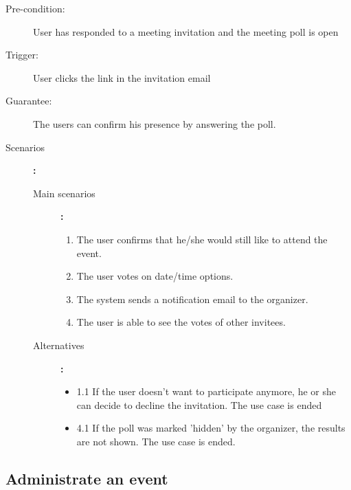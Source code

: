 \begin{description}
	\item[Pre-condition:] User has responded to a meeting invitation and the meeting poll is open
	\item[Trigger:] User clicks the link in the invitation email
	\item[Guarantee:] The users can confirm his presence by answering the poll.
	\item[Scenarios]\textbf{:}\\
				\begin{description}
					\item[Main scenarios]\textbf{:}\\
								\begin{enumerate}
									\item The user confirms that he/she would still like to attend the event.
									\item The user votes on date/time options.
									\item The system sends a notification email to the organizer.
									\item The user is able to see the votes of other invitees.
								\end{enumerate}
					\item[Alternatives]\textbf{:}\\
								\begin{itemize}
									\item 1.1 If the user doesn't want to participate anymore, he or she can decide to decline the invitation. The use case is ended
									\item 4.1 If the poll was marked 'hidden' by the organizer, the results are not shown. The use case is ended.
								\end{itemize}
				\end{description}
\end{description}

\subsection{Administrate an event}

